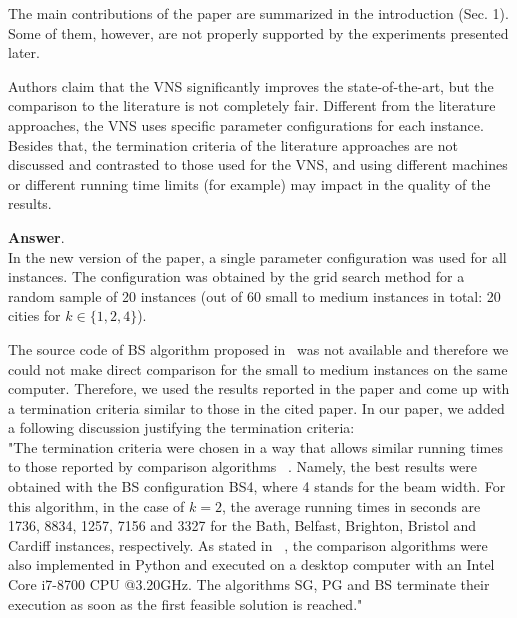 \documentclass [11pt]{scrartcl}
\begin{document}
\begin{leftbar}
  
The main contributions of the paper are summarized in the introduction (Sec. 1). Some of them, however, are not properly supported by the experiments presented later.
\end{leftbar}
\begin{enumerate}
	\textbf{Answer}. \\
	In the new version of the paper, a single parameter configuration was used for all instances. The configuration was obtained by the grid search method for a random sample of 20 instances (out of 60 small to medium instances in total: 20 cities for $k \in \{1,2,4\}$).
	
	The source code of BS algorithm proposed in~\cite{corcoran2021heuristics} was not available and therefore we could not make direct comparison for the small to medium instances on the same computer. Therefore, we used the results reported in the paper and come up with a termination criteria similar to those in the cited paper. 
	In our paper, we added a following discussion justifying the termination criteria:\\
	"The termination criteria were chosen in a way that allows similar running times to those reported by comparison algorithms ~\cite{corcoran2021heuristics}. Namely, the best results were obtained with the BS configuration BS4, where 4 stands for the beam width. For this algorithm, in the case of $k=2$, the average running times in seconds are 1736, 8834, 1257, 7156 and 3327 for the Bath, Belfast, Brighton, Bristol and Cardiff instances, respectively. As stated in ~\cite{corcoran2021heuristics}, the comparison algorithms were also implemented in  Python and executed on a desktop computer with an Intel Core i7-8700 CPU @3.20GHz. The algorithms SG, PG and BS terminate their execution as soon as the first feasible solution is reached."
	

\end{enumerate}
\end{document}
